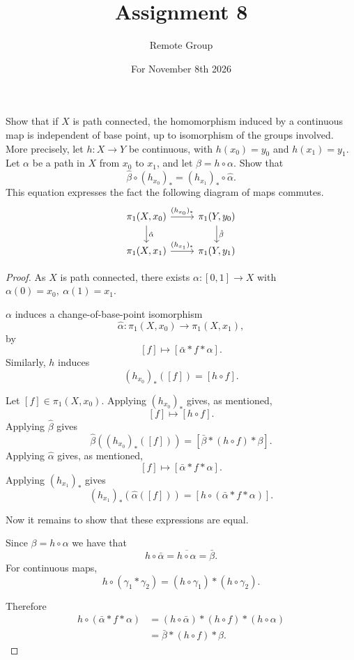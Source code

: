 \documentclass[11pt]{article}
\title{Assignment 8}
\author{Remote Group}
\date{For November 8th 2026} %
\begin{document}
\maketitle
\begin{prob*}[Munkres 52.6]
    Show that if $X$ is path connected, the 
    homomorphism induced by a continuous map 
    is independent of base point, up to 
    isomorphism of the groups involved. 
    More precisely, let $h : X \to Y$ be continuous, 
    with $h(x_0) = y_0$ and $h(x_1) = y_1$. 
    Let $\alpha$ be a path in $X$ from $x_0$ to 
    $x_1$, and let $\beta = h \circ \alpha$. Show that 
    \[
        \hat \beta \circ (h_{x_0})_* = 
        (h_{x_1})_* \circ \hat \alpha. 
    \]
    This equation expresses the fact the following 
    diagram of maps commutes. 
    \[
        \begin{tikzcd}
            \pi_1(X,x_0) \ar[d,"\hat \alpha"] \ar[r, "(h_{x_0})_*"] 
            & \pi_1(Y,y_0) \ar[d, "\hat \beta"] \\ 
            \pi_1(X,x_1) \ar[r, "(h_{x_1})_*"] 
            & \pi_1(Y,y_1) 
        \end{tikzcd}
    \]
\end{prob*}
\begin{proof}
    As $X$ is path connected, there exists 
    $\alpha : [0,1] \to X$ with 
    $\alpha(0) = x_0, \ \alpha(1) = x_1$. 

    $\alpha$ induces a change-of-base-point isomorphism 
    \[
        \hat \alpha : 
        \pi_1(X,x_0) \to \pi_1(X,x_1), 
    \]
    by 
    \[
        [f] \mapsto [\bar \alpha * f * \alpha]. 
    \]
    Similarly, $h$ induces 
    \[
        (h_{x_0})_*([f]) = [h \circ f]. 
    \]

    Let $[f] \in \pi_1(X,x_0)$. 
    Applying $(h_{x_0})_*$ gives, as mentioned,
    \[
        [f] \mapsto [h \circ f]. 
    \]
    Applying $\hat \beta$ gives 
    \[
        \hat\beta((h_{x_0})_*([f]))
        =
        [\bar\beta*(h\circ f)*\beta].
    \]
    Applying $\hat \alpha$ gives, as mentioned, 
    \[
        [f] \mapsto [\bar \alpha * f * \alpha]. 
    \]
    Applying $(h_{x_1})_*$ gives 
    \[
        (h_{x_1})_*(\hat\alpha([f]))
        =
        [h\circ(\bar\alpha*f*\alpha)].
    \]

    Now it remains to show that these expressions are equal. 

    Since $\beta = h \circ \alpha$ we have that 
    \[
        h \circ \bar \alpha = \overline{h \circ \alpha} 
        = \bar \beta. 
    \]
    For continuous maps, 
    \[
        h\circ(\gamma_1*\gamma_2)
        =
        (h\circ\gamma_1)*(h\circ\gamma_2).
    \]

    Therefore 
    \[
        \begin{aligned}
            h\circ(\bar\alpha*f*\alpha)
            &=(h\circ\bar\alpha)*(h\circ f)*(h\circ\alpha)\\
            &=\bar\beta*(h\circ f)*\beta.
        \end{aligned}
    \]
\end{proof}
\end{document}
